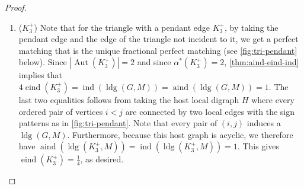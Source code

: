 \documentclass[reqno,11pt]{amsart}
\numberwithin{equation}{section}
\theoremstyle{definition}
\theoremstyle{remark}
\newcommand{\abs}[1]{\left\lvert#1\right\rvert}
\DeclareMathOperator{\ind}{ind}
\DeclareMathOperator{\eind}{eind}
\DeclareMathOperator{\aind}{aind}
\DeclareMathOperator{\ldg}{ldg}
\DeclareMathOperator{\Aut}{Aut}
\begin{document}
\begin{proof}
\begin{enumerate}[leftmargin=*,topsep=0pt]
\begin{figure}[!htp]
        \caption{Local digraph for $P_4$.}
        \label{fig:path-four}
    \end{figure}
    
    \item [(6)] ($K_3^+$) Note that for the triangle with a pendant edge $K_3^+$, by taking the pendant edge and the edge of the triangle not incident to it, we get a perfect matching that is the unique fractional perfect matching (see \cref{fig:tri-pendant} below). Since $\abs{\Aut(K_3^+)}=2$ and since $\alpha^*(K_3^+)=2$, \cref{thm:aind-eind-ind} implies that $4 \eind(K_3^+) = \ind(\ldg(G,M)) = \aind(\ldg(G,M)) = 1$. The last two equalities follows from taking the host local digraph $H$ where every ordered pair of vertices $i < j$ are connected by two local edges with the sign patterns as in \cref{fig:tri-pendant}. Note that every pair of $(i,j)$ induces a $\ldg(G,M)$. Furthermore, because this host graph is acyclic, we therefore have $\aind(\ldg(K_3^+,M)) = \ind(\ldg(K_3^+,M))=1$. This gives $\eind(K_3^+) = \frac{1}{4}$, as desired. 

    \begin{figure}[!htp]
        \centering
    
\end{figure}
\end{enumerate}
\end{proof}
\end{document}
